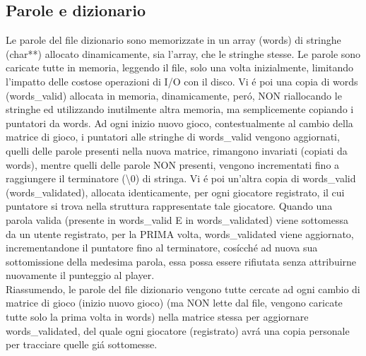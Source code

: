 \subsection{Parole e dizionario}
\label{subsec:paroledizionario}
Le parole del file dizionario sono memorizzate in un array (words) di stringhe (char**) allocato dinamicamente, sia l'array, che le stringhe stesse. Le parole sono caricate tutte in memoria, leggendo il file, solo una volta inizialmente, limitando l'impatto delle costose operazioni di I/O con il disco. Vi \'e poi una copia di words (words\_valid) allocata in memoria, dinamicamente, per\'o, NON riallocando le stringhe ed utilizzando inutilmente altra memoria, ma semplicemente copiando i puntatori da words. Ad ogni inizio nuovo gioco, contestualmente al cambio della matrice di gioco, i puntatori alle stringhe di words\_valid vengono aggiornati, quelli delle parole presenti nella nuova matrice, rimangono invariati (copiati da words), mentre quelli delle parole NON presenti, vengono incrementati fino a raggiungere il terminatore (\textbackslash0) di stringa. Vi \'e poi un'altra copia di words\_valid (words\_validated), allocata identicamente, per ogni giocatore registrato, il cui puntatore si trova nella struttura rappresentate tale giocatore. Quando una parola valida (presente in words\_valid E in words\_validated) viene sottomessa da un utente registrato, per la PRIMA volta, words\_validated viene aggiornato, incrementandone il puntatore fino al terminatore, cos\'icch\'e ad nuova sua sottomissione della medesima parola, essa possa essere rifiutata senza attribuirne nuovamente il punteggio al player.
\\
Riassumendo, le parole del file dizionario vengono tutte cercate ad ogni cambio di matrice di gioco (inizio nuovo gioco) (ma NON lette dal file, vengono caricate tutte solo la prima volta in words) nella matrice stessa per aggiornare words\_validated, del quale ogni giocatore (registrato) avr\'a una copia personale per tracciare quelle gi\'a sottomesse. 
\\
